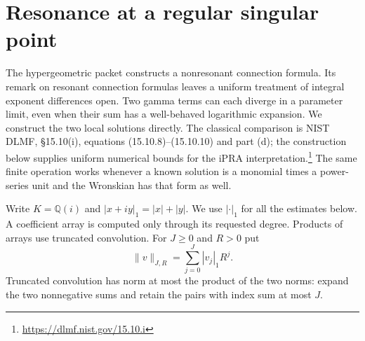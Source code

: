 \section{Resonance at a regular singular point}
\label{sec:resonance}

The hypergeometric packet constructs a nonresonant connection formula. Its
remark on resonant connection formulas leaves a uniform treatment of integral
exponent differences open. Two gamma terms can each diverge in a parameter
limit, even when their sum has a well-behaved logarithmic expansion. We
construct the two local solutions directly. The classical comparison is
NIST DLMF, \S15.10(i), equations (15.10.8)--(15.10.10) and part (d);
the construction below supplies uniform numerical bounds for the
iPRA interpretation.\footnote{\url{https://dlmf.nist.gov/15.10.i}}
The same finite operation works
whenever a known solution is a monomial times a power-series unit and the
Wronskian has that form as well.

Write $K=\mathbb Q(i)$ and $|x+iy|_1=|x|+|y|$. We use $|\cdot|_1$ for
all the estimates below. A coefficient array is computed only through its
requested degree. Products of arrays use truncated convolution. For
$J\ge0$ and $R>0$ put
\[
  \|v\|_{J,R}=\sum_{j=0}^J |v_j|_1R^j .
\]
Truncated convolution has norm at most the product of the two norms: expand
the two nonnegative sums and retain the pairs with index sum at most $J$.

